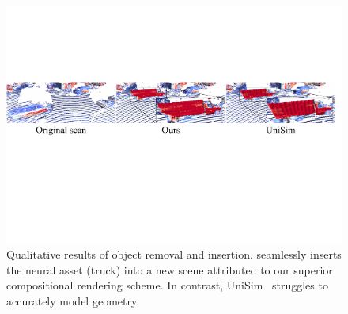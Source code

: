 \begin{figure}[t]
    \centering
    \includegraphics[width=0.8\columnwidth]{Figures/vehicle_insertion.pdf}
    \caption{
    Qualitative results of object removal and insertion. \dynfl seamlessly inserts the neural asset (truck) into a new scene attributed to our superior compositional rendering scheme. In contrast, UniSim~\cite{yang2023unisim} struggles to accurately model geometry.
    }
    \label{fig:vehicle_insertion}
\end{figure}